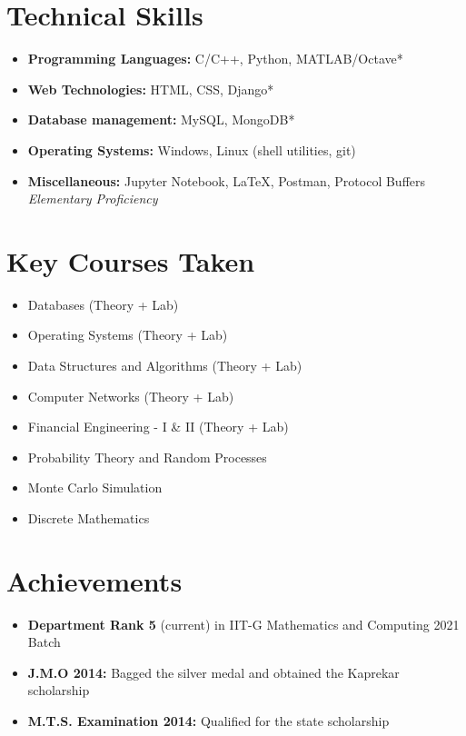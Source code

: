 \documentclass[a4paper,10pt]{report}
\newcommand{\resumeItem}[2]{
  \item\small{
    \textbf{#1}{ #2 \vspace{-2pt}}
  }
}
\newcommand{\resumeSubItem}[2]{\resumeItem{#1}{#2}\vspace{-4pt}}
\newcommand{\resumeSubHeadingListStart}{\begin{itemize}[leftmargin=*]}
\newcommand{\resumeSubHeadingListEnd}{\end{itemize}}
\begin{document}
\vspace{-7pt}
    \section{Technical Skills}
        \resumeSubHeadingListStart
            \resumeSubItem
                {Programming Languages:}{C/C++, Python, MATLAB/Octave*}
            \resumeSubItem
                {Web Technologies:}{HTML, CSS, Django*}
            \resumeSubItem
                {Database management:}{MySQL, MongoDB*}
            \resumeSubItem
                {Operating Systems:}{Windows, Linux (shell utilities, git)}
            \resumeSubItem
                {Miscellaneous:}{Jupyter Notebook, \LaTeX, Postman, Protocol Buffers \hfill *\textit{Elementary Proficiency}}
        \resumeSubHeadingListEnd


\vspace{-3pt}
    \section{Key Courses Taken}
        \vspace{-2pt}
            \begin{multicols}{2}
                \begin{itemize}[leftmargin = *,itemsep=-3pt]
                    \item Databases (Theory + Lab)
                    \item Operating Systems (Theory + Lab)
                    \item Data Structures and Algorithms (Theory + Lab)
                    \item Computer Networks (Theory + Lab)
                    \item Financial Engineering - I \& II (Theory + Lab)
                    \item Probability Theory and Random Processes
                    \item Monte Carlo Simulation
                    \item Discrete Mathematics
                \end{itemize}
            \end{multicols}


\vspace{-3.5pt}
    \section{Achievements}
        \resumeSubHeadingListStart
            \resumeSubItem{Department Rank 5}{(current) in IIT-G Mathematics and Computing 2021 Batch}
            \resumeSubItem{J.M.O 2014:}{Bagged the silver medal and obtained the Kaprekar scholarship}
            \resumeSubItem{M.T.S. Examination 2014:}{Qualified for the state scholarship}
        \resumeSubHeadingListEnd
\end{document}
